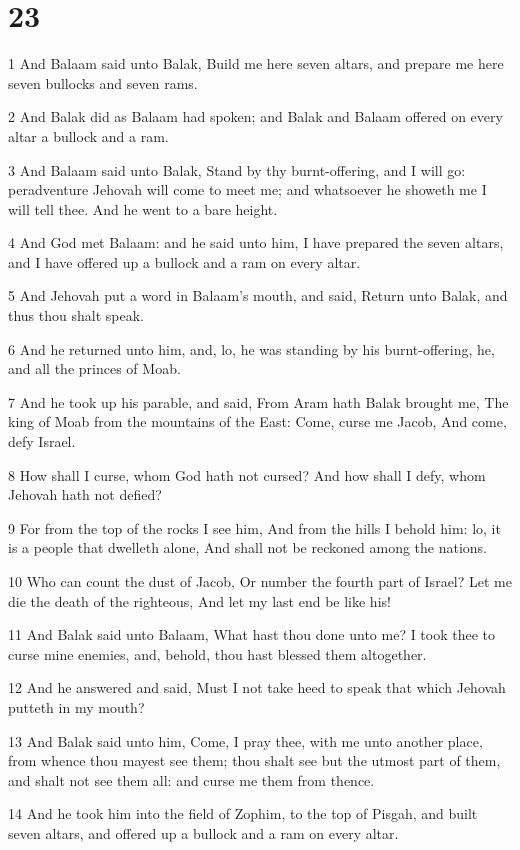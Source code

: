 \chapter{23}

\par 1 And Balaam said unto Balak, Build me here seven altars, and prepare me here seven bullocks and seven rams.
\par 2 And Balak did as Balaam had spoken; and Balak and Balaam offered on every altar a bullock and a ram.
\par 3 And Balaam said unto Balak, Stand by thy burnt-offering, and I will go: peradventure Jehovah will come to meet me; and whatsoever he showeth me I will tell thee. And he went to a bare height.
\par 4 And God met Balaam: and he said unto him, I have prepared the seven altars, and I have offered up a bullock and a ram on every altar.
\par 5 And Jehovah put a word in Balaam's mouth, and said, Return unto Balak, and thus thou shalt speak.
\par 6 And he returned unto him, and, lo, he was standing by his burnt-offering, he, and all the princes of Moab.
\par 7 And he took up his parable, and said, From Aram hath Balak brought me, The king of Moab from the mountains of the East: Come, curse me Jacob, And come, defy Israel.
\par 8 How shall I curse, whom God hath not cursed? And how shall I defy, whom Jehovah hath not defied?
\par 9 For from the top of the rocks I see him, And from the hills I behold him: lo, it is a people that dwelleth alone, And shall not be reckoned among the nations.
\par 10 Who can count the dust of Jacob, Or number the fourth part of Israel? Let me die the death of the righteous, And let my last end be like his!
\par 11 And Balak said unto Balaam, What hast thou done unto me? I took thee to curse mine enemies, and, behold, thou hast blessed them altogether.
\par 12 And he answered and said, Must I not take heed to speak that which Jehovah putteth in my mouth?
\par 13 And Balak said unto him, Come, I pray thee, with me unto another place, from whence thou mayest see them; thou shalt see but the utmost part of them, and shalt not see them all: and curse me them from thence.
\par 14 And he took him into the field of Zophim, to the top of Pisgah, and built seven altars, and offered up a bullock and a ram on every altar.
